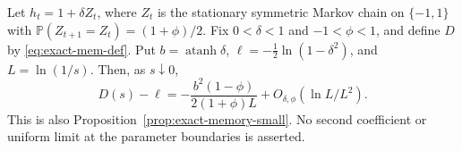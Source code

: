 \begin{proposition}
\label{prop:exact-mem-small}
Let $h_t=1+\delta Z_t$, where $Z_t$ is the stationary symmetric
Markov chain on $\{-1,1\}$ with
$\mathbb P(Z_{t+1}=Z_t)=(1+\phi)/2$. Fix $0<\delta<1$ and
$-1<\phi<1$, and define $D$ by \eqref{eq:exact-mem-def}.
Put $b=\operatorname{atanh}\delta$, $\ell=-\tfrac12\ln(1-\delta^2)$,
and $L=\ln(1/s)$. Then, as $s\downarrow0$,
\begin{equation}
 D(s)-\ell=-\frac{b^2(1-\phi)}{2(1+\phi)L}
       +O_{\delta,\phi}(\ln L/L^2).
 \label{eq:exact-mem-small}
\end{equation}
This is also Proposition~\ref{prop:exact-memory-small}. No second
coefficient or uniform limit at the parameter boundaries is asserted.
\end{proposition}


